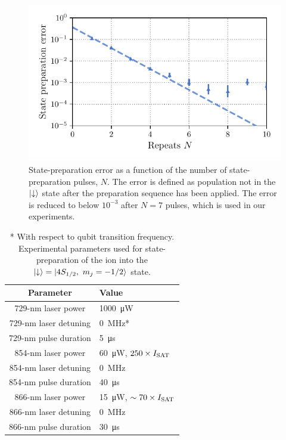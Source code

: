    \begin{figure}
        \begin{center}
        \noindent\includegraphics[width=0.75\linewidth]{
            figures/pdf_figure/state_prep.pdf
            }
        \end{center}
        \caption{
            State-preparation error as a function of the number of state-preparation pulses, $N$. The error is defined as population not in the $\ket{\downarrow}$ state after the preparation sequence has been applied. The error is reduced to below $10^{-3}$ after $N=7$ pulses, which is used in our experiments.
            }
        \label{fig:stateprep}
    \end{figure}

\begin{table}
    \begin{center}
    \begin{tabular}{|c|l|}
        \hline
        Parameter & Value \\
        \hline
        729-nm laser power & 1000~\unit{\uW}\\
        729-nm laser detuning & 0~\unit{\MHz}* \\
        729-nm pulse duration & 5~\unit{\us} \\
        854-nm laser power & 60~\unit{\uW}, $250\times I_{\rm SAT}$\\
        854-nm laser detuning & 0~\unit{\MHz} \\
        854-nm pulse duration & 40~\unit{\us} \\
        866-nm laser power & 15~\unit{\uW}, $\sim 70\times I_{\rm SAT}$\\
        866-nm laser detuning & 0~\unit{\MHz} \\
        866-nm pulse duration & 30~\unit{\us} \\
        \hline
    \end{tabular}
    \end{center}
    \caption{
        * With respect to qubit transition frequency.\\
        Experimental parameters used for state-preparation of the ion into the $\ket{\downarrow} = \ket{4S_{1/2},~m_j = -1/2}$ state.
        }
    \label{tab:state_prep_parameters}
\end{table}

